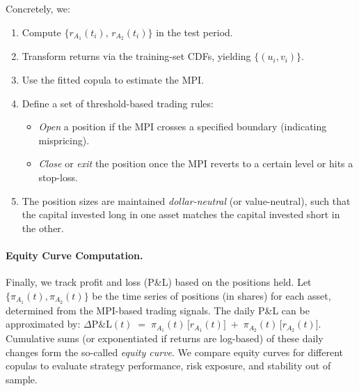 Concretely, we:
\begin{enumerate}
    \item Compute $\{ r_{A_1}(t_i),\,r_{A_2}(t_i)\}$ in the test period.
    \item Transform returns via the training-set CDFs, yielding $\{ (u_i, v_i)\}$.
    \item Use the fitted copula to estimate the MPI.  
    \item Define a set of threshold-based trading rules:
    \begin{itemize}
        \item \textit{Open} a position if the MPI crosses a specified boundary (indicating mispricing).
        \item \textit{Close} or \textit{exit} the position once the MPI reverts to a certain level or hits a stop-loss.
    \end{itemize}
    \item The position sizes are maintained \textit{dollar-neutral} (or value-neutral), such that the capital invested long in one asset matches the capital invested short in the other.
\end{enumerate}

\paragraph{Equity Curve Computation.}
Finally, we track profit and loss (P\&L) based on the positions held. Let $\{ \pi_{A_1}(t), \pi_{A_2}(t)\}$ be the time series of positions (in shares) for each asset, determined from the MPI-based trading signals. The daily P\&L can be approximated by:
$
   \Delta \text{P\&L}(t) 
   \;=\; \pi_{A_1}(t) \, \bigl[r_{A_1}(t)\bigr] \;+\; \pi_{A_2}(t) \, \bigl[r_{A_2}(t)\bigr].
$
Cumulative sums (or exponentiated if returns are log-based) of these daily changes form the so-called \textit{equity curve}. We compare equity curves for different copulas to evaluate strategy performance, risk exposure, and stability out of sample.



